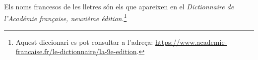 Els noms francesos de les lletres són els que apareixen en el \textit{Dictionnaire de l'Académie française, neuvième édition}.\footnote{Aquest diccionari es pot consultar a l'adreça: \href{https://www.academie-francaise.fr/le-dictionnaire/la-9e-edition}{https:/\!\!/www.academie-francaise.fr/le-dictionnaire/la-9e-edition}.} 
